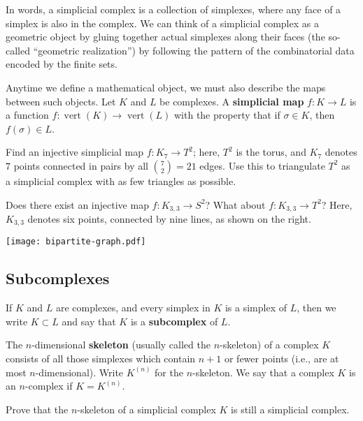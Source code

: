 \documentclass[12pt]{pset}
\newcommand{\defnword}[1]{\textbf{#1}}
\DeclareMathOperator{\vertices}{vert}
\begin{document}
\begin{definition*}
  In words, a simplicial complex is a collection of simplexes, where
  any face of a simplex is also in the complex.  We can think of a
  simplicial complex as a geometric object by gluing together actual
  simplexes along their faces (the so-called ``geometric
  realization'') by following the pattern of the combinatorial data
  encoded by the finite sets.

  Anytime we define a mathematical object, we must also describe the
  maps between such objects.  Let $K$ and $L$ be complexes.  A
  \defnword{simplicial map} $f : K \to L$ is a function $f :
  \vertices(K) \to \vertices(L)$ with the property that if $\sigma \in
  K$, then $f(\sigma) \in L$.
\end{definition*}

\begin{requiredproblem}
  Find an injective simplicial map $f : K_7 \to T^2$; here, $T^2$ is
  the torus, and $K_7$ denotes $7$ points connected in pairs by all
  $\displaystyle\binom{7}{2} = 21$ edges.  Use this to triangulate
  $T^2$ as a simplicial complex with as few triangles as possible.
\end{requiredproblem}

\noindent\parbox{0.85\textwidth}{%
\begin{problem}
 Does there exist an injective map $f : K_{3,3} \to S^2$?  What about
$f : K_{3,3} \to T^2$?  Here, $K_{3,3}$ denotes six points,
connected by nine lines, as shown on the right.
\end{problem}}%
\hspace{10pt}%
\parbox{0.15\textwidth}{%
\texttt{[image: bipartite-graph.pdf]}%
}


\subsection*{Subcomplexes}

\begin{definition*}
  If $K$ and $L$ are complexes, and every simplex in $K$ is a simplex
  of $L$, then we write $K \subset L$ and say that $K$ is a
  \defnword{subcomplex} of $L$.
\end{definition*}
\begin{example*}
  The $n$-dimensional \defnword{skeleton} (usually called the
  $n$-skeleton) of a complex $K$ consists of all those simplexes which
  contain $n+1$ or fewer points (i.e., are at most $n$-dimensional).
  Write $K^{(n)}$ for the $n$-skeleton.  We say that a complex $K$ is
  an $n$-complex if $K = K^{(n)}$.
\end{example*}
\begin{requiredproblem}
  Prove that the $n$-skeleton of a simplicial complex $K$ is still a
  simplicial complex.
\end{requiredproblem}
\end{document}
